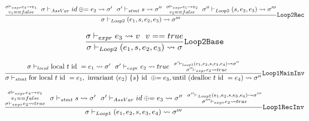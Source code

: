 \begin{equation} \label{eq:loop2Rec}
    \frac{\substack{\sigma \vdash_{expr} e_3 \leadsto v_1 \\
            v_1 == false} ~~
        \sigma \vdash_{AssVar} id \oplus{\kern-5.0pt}= e_2 \leadsto \sigma' ~~
        \sigma' \vdash_{stmt} s \leadsto \sigma'' ~~
        \substack{\sigma \vdash_{expr} e_1 \leadsto v_2 \\
            v_2 == false} ~~
        \sigma'' \vdash_{Loop2} (s, e_2, e_3) \leadsto \sigma'''}
    {\sigma \vdash_{Loop2} (e_1, s, e_2, e_3) \leadsto \sigma'''}
    \text{\texttt{Loop2Rec}}
\end{equation}

\begin{equation} \label{eq:loop2Base}
    \frac{\sigma \vdash_{expr} e_3 \leadsto v ~~
        v == true}
    {\sigma \vdash_{Loop2} (e_1, s, e_2, e_3) \leadsto \sigma}
    \text{\texttt{Loop2Base}}
\end{equation}

\begin{equation} \label{eq:loop1MainInv}
    \frac{\sigma \vdash_{local} \text{local } t \text{ id } = e_1 \leadsto \sigma' ~~
        \sigma' \vdash_{expr} e_2 \leadsto true ~~
        \substack{\sigma' \vdash_{loop1} (e_1, e_2, s, e_3, e_4) \leadsto \sigma'' \\
            \sigma'' \vdash_{expr} e_2 \leadsto true}}
    {\sigma \vdash_{stmt} \text{for local }t\text{ id }= e_1, \text{ invariant }(e_2) ~\{s\}\text{ id }\oplus{\kern-5.0pt}= e_3, \text{until (dealloc } t\text{ id }= e_4) \leadsto \sigma''}
    \text{\texttt{Loop1MainInv}}
\end{equation}


\begin{equation} \label{eq:loop1RecInv}
    \frac{\substack{\sigma \vdash_{expr} e_4 \leadsto v_1 \\
            v_1 == false \\
            \sigma \vdash_{expr} e_2 \leadsto true} ~~
        \sigma \vdash_{stmt} s \leadsto \sigma' ~~
        \sigma' \vdash_{AssVar} id \oplus{\kern-5.0pt}= e_3 \leadsto \sigma'' ~~
        \substack{\sigma'' \vdash_{Loop1} (e_1, e_2, s, e_3, e_4) \leadsto \sigma''' \\
        \sigma''' \vdash_{expr} e_2 \leadsto true}}
    {\sigma \vdash_{Loop1} (e_1, e_2, s, e_3, e_4) \leadsto \sigma'''}
    \text{\texttt{Loop1RecInv}}
\end{equation}

